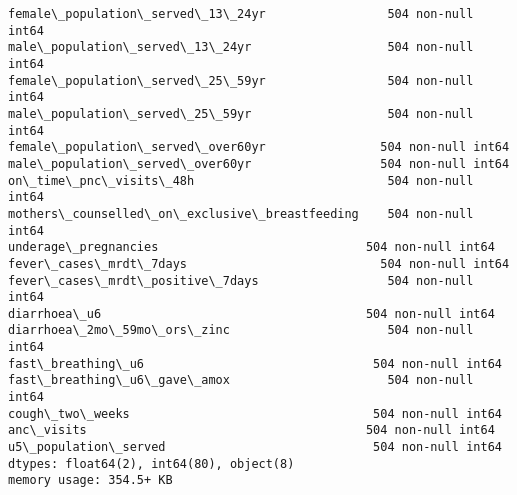 \documentclass[11pt]{article}
\begin{document}
\begin{Verbatim}[commandchars=\\\{\}]
female\_population\_served\_13\_24yr                 504 non-null int64
male\_population\_served\_13\_24yr                   504 non-null int64
female\_population\_served\_25\_59yr                 504 non-null int64
male\_population\_served\_25\_59yr                   504 non-null int64
female\_population\_served\_over60yr                504 non-null int64
male\_population\_served\_over60yr                  504 non-null int64
on\_time\_pnc\_visits\_48h                           504 non-null int64
mothers\_counselled\_on\_exclusive\_breastfeeding    504 non-null int64
underage\_pregnancies                             504 non-null int64
fever\_cases\_mrdt\_7days                           504 non-null int64
fever\_cases\_mrdt\_positive\_7days                  504 non-null int64
diarrhoea\_u6                                     504 non-null int64
diarrhoea\_2mo\_59mo\_ors\_zinc                      504 non-null int64
fast\_breathing\_u6                                504 non-null int64
fast\_breathing\_u6\_gave\_amox                      504 non-null int64
cough\_two\_weeks                                  504 non-null int64
anc\_visits                                       504 non-null int64
u5\_population\_served                             504 non-null int64
dtypes: float64(2), int64(80), object(8)
memory usage: 354.5+ KB

    \end{Verbatim}
\end{document}
